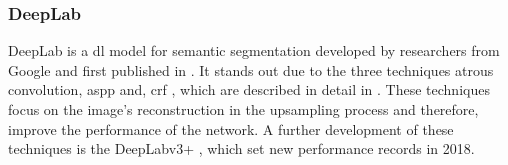 \subsubsection{DeepLab}
DeepLab is a \gls{dl} model for semantic segmentation developed by researchers from Google and first published in \cite{Chen16-DeepLab}.
It stands out due to the three techniques atrous convolution, \gls{aspp} \cite{He15-SPP} and, \gls{crf} \cite{KK12-CRF}, which are described in detail in \cite{Chen16-DeepLab}.
These techniques focus on the image's reconstruction in the upsampling process and therefore, improve the performance of the network.
A further development of these techniques is the DeepLabv3+ \cite{Chen18-DeepLab3+}, which set new performance records in 2018.

	


